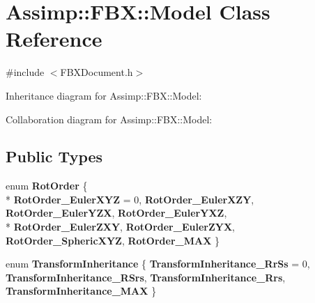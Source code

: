 \hypertarget{class_assimp_1_1_f_b_x_1_1_model}{\section{Assimp\+:\+:F\+B\+X\+:\+:Model Class Reference}
\label{class_assimp_1_1_f_b_x_1_1_model}
}


{\ttfamily \#include $<$F\+B\+X\+Document.\+h$>$}



Inheritance diagram for Assimp\+:\+:F\+B\+X\+:\+:Model\+:


Collaboration diagram for Assimp\+:\+:F\+B\+X\+:\+:Model\+:
\subsection*{Public Types}
\begin{DoxyCompactItemize}
\item 
\hypertarget{class_assimp_1_1_f_b_x_1_1_model_a8dd558c4255d7296f42c1924cab03d97}{enum {\bfseries Rot\+Order} \{ \\*
{\bfseries Rot\+Order\+\_\+\+Euler\+X\+Y\+Z} = 0, 
{\bfseries Rot\+Order\+\_\+\+Euler\+X\+Z\+Y}, 
{\bfseries Rot\+Order\+\_\+\+Euler\+Y\+Z\+X}, 
{\bfseries Rot\+Order\+\_\+\+Euler\+Y\+X\+Z}, 
\\*
{\bfseries Rot\+Order\+\_\+\+Euler\+Z\+X\+Y}, 
{\bfseries Rot\+Order\+\_\+\+Euler\+Z\+Y\+X}, 
{\bfseries Rot\+Order\+\_\+\+Spheric\+X\+Y\+Z}, 
{\bfseries Rot\+Order\+\_\+\+M\+A\+X}
 \}}\label{class_assimp_1_1_f_b_x_1_1_model_a8dd558c4255d7296f42c1924cab03d97}

\item 
\hypertarget{class_assimp_1_1_f_b_x_1_1_model_a92ee637ba14ca202a06fe7f35d997bae}{enum {\bfseries Transform\+Inheritance} \{ {\bfseries Transform\+Inheritance\+\_\+\+Rr\+Ss} = 0, 
{\bfseries Transform\+Inheritance\+\_\+\+R\+Srs}, 
{\bfseries Transform\+Inheritance\+\_\+\+Rrs}, 
{\bfseries Transform\+Inheritance\+\_\+\+M\+A\+X}
 \}}\label{class_assimp_1_1_f_b_x_1_1_model_a92ee637ba14ca202a06fe7f35d997bae}

\end{DoxyCompactItemize}
